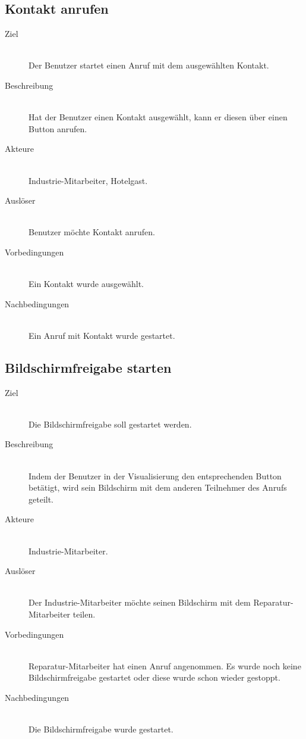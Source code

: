 \subsection{Kontakt anrufen}\label{subsec:kontakt-anrufen}
    \begin{description}
        \item[Ziel]\hfill \\
        Der Benutzer startet einen Anruf mit dem ausgewählten Kontakt.
        \item[Beschreibung]\hfill \\
        Hat der Benutzer einen Kontakt ausgewählt, kann er diesen über einen Button anrufen.
        \item[Akteure]\hfill \\
        Industrie-Mitarbeiter, Hotelgast.
        \item[Auslöser]\hfill \\
        Benutzer möchte Kontakt anrufen.
        \item[Vorbedingungen]\hfill \\
        Ein Kontakt wurde ausgewählt.
        \item[Nachbedingungen]\hfill \\
        Ein Anruf mit Kontakt wurde gestartet.
        \end{description}

\subsection{Bildschirmfreigabe starten}\label{subsec:bildschirmfreigabe-starten}
    \begin{description}
        \item[Ziel]\hfill \\
        Die Bildschirmfreigabe soll gestartet werden.
        \item[Beschreibung]\hfill \\
        Indem der Benutzer in der Visualisierung den entsprechenden Button betätigt, wird sein Bildschirm mit dem anderen Teilnehmer des Anrufs geteilt.
        \item[Akteure]\hfill \\
        Industrie-Mitarbeiter.
        \item[Auslöser]\hfill \\
        Der Industrie-Mitarbeiter möchte seinen Bildschirm mit dem Reparatur-Mitarbeiter teilen.
        \item[Vorbedingungen]\hfill \\
        Reparatur-Mitarbeiter hat einen Anruf angenommen.
        Es wurde noch keine Bildschirmfreigabe gestartet oder diese wurde schon wieder gestoppt.
        \item[Nachbedingungen]\hfill \\
        Die Bildschirmfreigabe wurde gestartet.
        \end{description}

